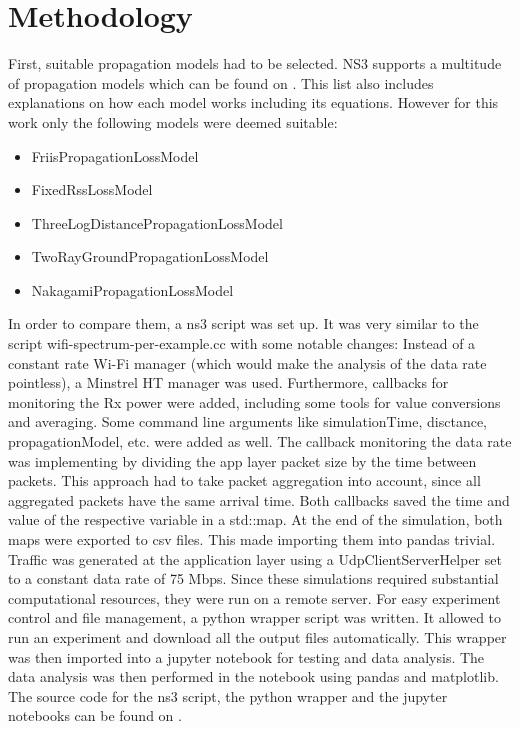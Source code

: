 \section[short]{Methodology}

First, suitable propagation models had to be selected.
NS3 supports a multitude of propagation models which can be found on \cite[the ns3 website]{ns3prpmod}.
This list also includes explanations on how each model works including its equations.
However for this work only the following models were deemed suitable:
\begin{itemize}
    \item FriisPropagationLossModel
    \item FixedRssLossModel
    \item ThreeLogDistancePropagationLossModel
    \item TwoRayGroundPropagationLossModel
    \item NakagamiPropagationLossModel
\end{itemize}
In order to compare them, a ns3 script was set up. It was very similar to the script wifi-spectrum-per-example.cc 
with some notable changes: Instead of a constant rate Wi-Fi manager (which would make the analysis of the data rate 
pointless), a Minstrel HT manager was used. 
Furthermore, callbacks for monitoring the Rx power were added, including some tools for value conversions and
averaging. Some command line arguments like simulationTime, disctance, propagationModel, etc. were added as well.
The callback monitoring the data rate was implementing by dividing the app layer packet size by the time between
packets. This approach had to take packet aggregation into account, since all aggregated packets have the same 
arrival time. 
Both callbacks saved the time and value of the respective variable in a std::map. At the end of the simulation, 
both maps were exported to csv files. This made importing them into pandas trivial.
Traffic was generated at the application layer using a UdpClientServerHelper set to a constant data rate of 75 Mbps.
Since these simulations required substantial computational resources, they were run on a remote server. 
For easy experiment control and file management, a python wrapper script was written. It allowed to run an experiment 
and download all the output files automatically. This wrapper was then imported into a jupyter notebook for 
testing and data analysis. The data analysis was then performed in the notebook using pandas and matplotlib.
The source code for the ns3 script, the python wrapper and the jupyter notebooks can be found on \cite[the author's github]{github}.

